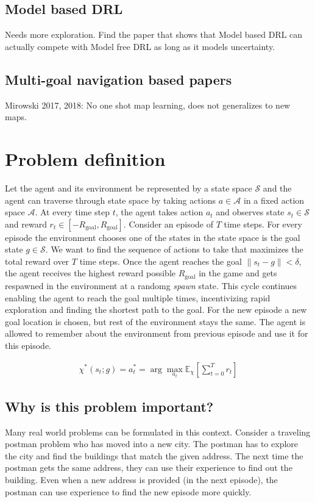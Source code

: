 \documentclass[letterpaper]{article} %
\def\state{s}
\def\act{a}
\def\State{\mathcal{S}}
\def\rew{r}
\def\E{\mathbb{E}}
\newcommand{\policy}{\chi}
\newcommand{\Act}{\mathcal{A}}
\newcommand{\goal}{g}
\begin{document}
\subsection{Model based DRL}
Needs more exploration.
Find the paper that shows that Model based DRL can actually compete with Model free DRL as long as it models uncertainty.

\subsection{Multi-goal navigation based papers}
Mirowski 2017, 2018: No one shot map learning, does not generalizes to new maps.

\section{Problem definition}
\newcommand{\Rgoal}{R_{\text{goal}}}
Let the agent and its environment be represented by a state space $\State$ and the
agent can traverse through state space by taking actions $\act \in \Act$ in a
fixed action space $\Act$. At every time step $t$, the agent takes action $\act_t$
and observes state $\state_t \in \State$ and reward
$\rew_t \in [-\Rgoal, \Rgoal]$.
Consider an episode of $T$ time steps.
For every episode the environment chooses one of the states in the state space is
the goal state $\goal \in \State$.
We want to find the sequence of actions to take that
maximizes the total reward over $T$ time steps.
Once the agent reaches the goal $\|\state_t - \goal\| < \delta$, the agent receives the highest reward possible $\Rgoal$ in the game and gets respawned in the environment at a randomg \emph{spawn} state.
This cycle continues enabling the agent to reach the goal multiple times,
incentivizing rapid exploration and finding the shortest path to the goal.
For the new episode a new goal location is chosen, but rest of the environment stays the same.
The agent is allowed to remember about the environment from previous episode and use
it for this episode.

%
\begin{align}
\policy^*(\state_t ; \goal) = \act^*_t = \arg \max_{\act_t} \E_{\policy}\left[ \sum_{t=0}^T \rew_t \right]
\end{align}%
%

\subsection{Why is this problem important?}
Many real world problems can be formulated in this context.
Consider a traveling postman problem who has moved into a new city. The postman has
to explore the city and find the buildings that match the given address.
The next time the postman gets the same address, they can use their experience to find out the building.
Even when a new address is provided (in the next episode), the postman can use
experience to find the new episode more quickly.
\end{document}
